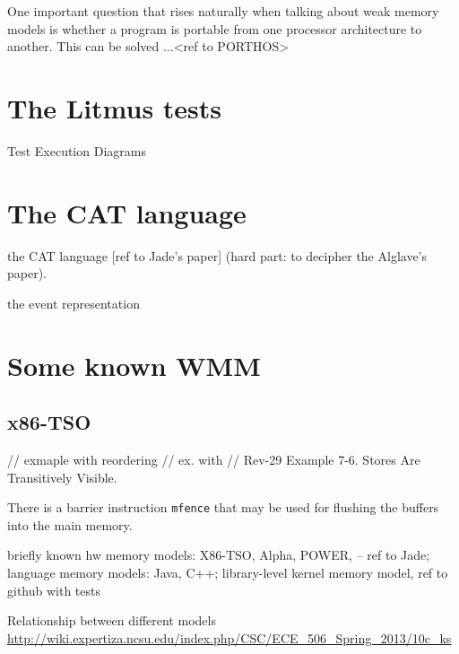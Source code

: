 One important question that rises naturally when talking about weak memory models is whether a program is portable from one processor architecture to another. This can be solved ...<ref to PORTHOS>


\section{The Litmus tests}

Test Execution Diagrams


\section{The CAT language}

the CAT language [ref to Jade's paper] (hard part: to decipher the Alglave's paper).

the event representation

\section{Some known WMM}

\subsection{x86-TSO}
\label{ch:wmm:x86}
// exmaple with reordering
// ex. with 
// Rev-29 Example 7-6. Stores Are Transitively Visible. %

There is a barrier instruction \texttt{mfence} that may be used for flushing the buffers into the main memory.

briefly known hw memory models: X86-TSO, Alpha, POWER, -- ref to Jade;
language memory models: Java, C++;
library-level kernel memory model, ref to github with tests

Relationship between different models \url{http://wiki.expertiza.ncsu.edu/index.php/CSC/ECE_506_Spring_2013/10c_ks}

